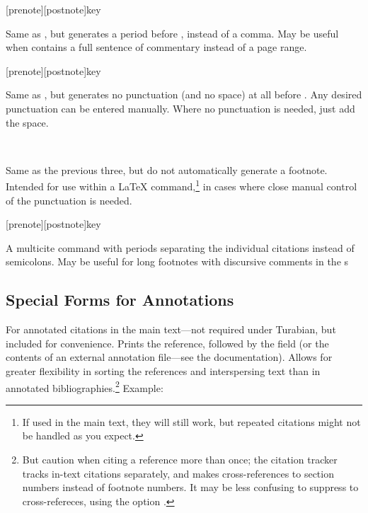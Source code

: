 \documentclass{ltxdockit}[2010/02/12]
\begin{document}
\begin{ltxsyntax}
[prenote][postnote]{key}

Same as , but generates a period before , instead of a comma. May be useful when  contains a full sentence of commentary instead of a page range.

[prenote][postnote]{key} 

Same as , but generates no punctuation (and no space) at all before . Any desired punctuation can be entered manually. Where no punctuation is needed, just add the space.

\ %

Same as the previous three, but do not automatically generate a footnote. Intended for use within a \LaTeX {} command,\footnote{If used in the main text, they will still work, but repeated citations might not be handled as you expect.} in cases where close manual control of the punctuation is needed.

[prenote][postnote]{key} 

A multicite command with periods separating the individual citations instead of semicolons. May be useful for long footnotes with discursive comments in the s

\subsection{Special Forms for Annotations}\label{citeannote}


For annotated citations in the main text---not required under Turabian, but included for convenience. Prints the reference, followed by the  field (or the contents of an external annotation file---see the  documentation). Allows for greater flexibility in sorting the references and interspersing text than in annotated bibliographies.\footnote{But caution when citing a reference more than once; the citation tracker tracks in-text citations separately, and makes cross-references to section numbers instead of footnote numbers. It may be less confusing to suppress to cross-refereces, using the option .}
Example:



\end{ltxsyntax}
\end{document}
